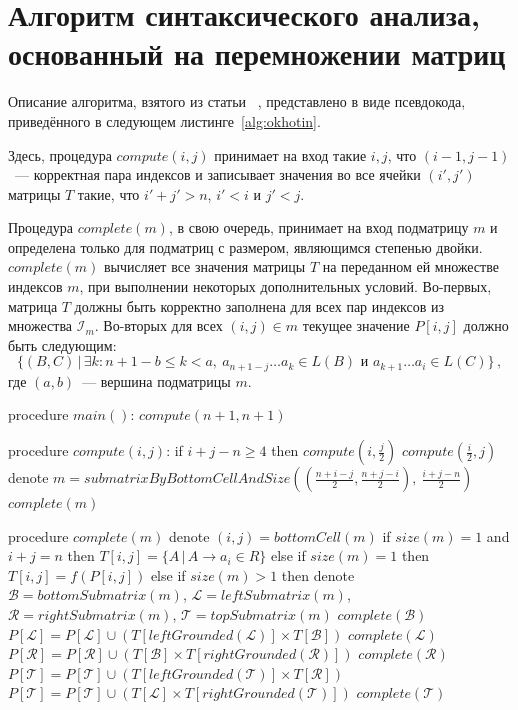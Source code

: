 \documentclass[12pt]{article}  %
\theoremstyle{definition}
\theoremstyle{remark}
\begin{document}
\section{Алгоритм синтаксического анализа, основанный на перемножении матриц}
\label{se:okhotin}

Описание алгоритма, взятого из статьи ~\cite{okhotin13}, представлено в виде псевдокода, приведённого в следующем листинге~\ref{alg:okhotin}. 

Здесь, процедура $compute(i, j)$ принимает на вход такие $i, j$, что $(i-1,j-1)$~--- корректная пара индексов и записывает значения во все ячейки $(i', j')$ матрицы $T$ такие, что  $i' + j' > n$, $i' < i$ и $j' < j$. 

Процедура $complete(m)$, в свою очередь, принимает на вход подматрицу $m$ и определена только для подматриц с размером, являющимся степенью двойки. $complete(m)$ вычисляет все значения матрицы $T$ на переданном ей множестве индексов $m$, при выполнении некоторых дополнительных условий. Во-первых, матрица $T$ должны быть корректно заполнена для всех пар индексов из множества $\mathcal{I}_m$. Во-вторых для всех $(i,j) \in m$ текущее значение $P[i,j]$ должно быть следующим:
$$\{(B,C)\,|\,\exists k: n + 1 - b \leqslant k < a,\ a_{n+1-j}\dots a_k \in L(B) \mbox{ и } a_{k+1}\dots a_i \in L(C)\}\,,$$
где $(a,b)$~--- вершина подматрицы $m$.

\begin{algorithm}[caption={Алгоритм синтаксического анализа, основанный на перемножении матриц}, label={alg:okhotin}] 
procedure $main()$:
    $compute(n + 1, n + 1)$
    
procedure $compute(i, j)$:
    if $i + j - n \geqslant 4$ then
        $compute\left(i, \frac{j}{2}\right)$
        $compute\left(\frac{i}{2}, j\right)$
    denote $m = submatrixByBottomCellAndSize\left(\left(\frac{n + i - j}{2},\frac{n + j - i}{2}\right),\ \frac{i + j - n}{2}\right)$
    $complete(m)$
    
procedure $complete(m)$
    denote $(i, j) = bottomCell(m)$
    if $size(m) = 1$ and $i + j = n$ then
        $T[i,j] = \{A\,|\,A\to a_i \in R\}$
    else if $size(m) = 1$ then
        $T[i,j] = f(P[i,j])$
    else if $size(m) > 1$ then
        denote $\mathcal{B} = bottomSubmatrix(m)$, $\mathcal{L} = leftSubmatrix(m)$,
               $\mathcal{R} = rightSubmatrix(m)$, $\mathcal{T} = topSubmatrix(m)$
        $complete(\mathcal{B})$
        $P[\mathcal{L}] = P[\mathcal{L}] \cup \left(T[leftGrounded(\mathcal{L})] \times T[\mathcal{B}]\right)$
        $complete(\mathcal{L})$
        $P[\mathcal{R}] = P[\mathcal{R}] \cup \left(T[\mathcal{B}] \times T[rightGrounded(\mathcal{R})]\right)$
        $complete(\mathcal{R})$
        $P[\mathcal{T}] = P[\mathcal{T}] \cup \left(T[leftGrounded(\mathcal{T})] \times T[\mathcal{R}]\right)$
        $P[\mathcal{T}] = P[\mathcal{T}] \cup \left(T[\mathcal{L}] \times T[rightGrounded(\mathcal{T})]\right)$
        $complete(\mathcal{T})$
\end{algorithm}
\end{document}

